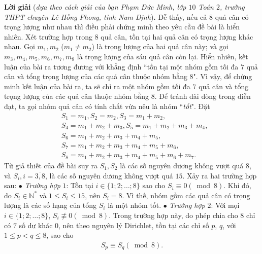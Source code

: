 \begin{multicols}{2}
	\vskip 0.05cm
	\textbf{\color{thachthuctoanhoc}Lời giải} (\textit{dựa theo cách giải của bạn Phạm Đức Minh, lớp $10$ Toán $2$, trường THPT chuyên Lê Hồng Phong, tỉnh Nam Định})\textbf{\color{thachthuctoanhoc}.}
	\vskip 0.05cm
	Dễ thấy, nếu cả $8$ quả cân có trọng lượng như nhau thì điều phải chứng minh theo yêu cầu đề bài là hiển nhiên.
	\vskip 0.05cm
	Xét trường hợp trong $8$ quả cân, tồn tại hai quả cân có trọng lượng khác nhau. Gọi $m_1, m_2$  ($m_1 \ne m_2$) là trọng lượng của hai quả cân này; và gọi $m_3, m_4, m_5,m_6,m_7,m_8$  là trọng lượng của sáu quả cân còn lại.
	\vskip 0.05cm
	Hiển nhiên, kết luận của bài ra tương đương với khẳng định ``tồn tại một nhóm gồm tối đa $7$ quả cân và tổng trọng lượng của các quả cân thuộc nhóm bằng $8$".
	\vskip 0.05cm
	Vì vậy, để chứng minh kết luận của bài ra, ta sẽ chỉ ra một nhóm gồm tối đa $7$ quả cân và tổng trọng lượng của các quả cân thuộc nhóm bằng $8$. Để tránh dài dòng trong diễn đạt, ta gọi nhóm quả cân có tính chất vừa nêu là nhóm ``\textit{tốt}".
	\vskip 0.05cm
	Đặt
	\begin{align*}
		&{S_1} = {m_1},{S_2} = {m_2},{S_3} = {m_1} + {m_2},\\
		&{S_4} = {m_1} \!+\! {m_2} \!+\! {m_3},
		{S_5} = {m_1} \!+\! {m_2} \!+\! {m_3} \!+\! {m_4},\\
		&{S_6} = {m_1} + {m_2} + {m_3} + {m_4} + {m_5},\\
		&{S_7} = {m_1} + {m_2} + {m_3} + {m_4} + {m_5} + {m_6},\\
		&{S_8} = {m_1} + {m_2} + {m_3} + {m_4} + {m_5} + {m_6} + {m_7}.
	\end{align*}
	Từ giả thiết của đề bài suy ra $S_1,S_2$  là các số nguyên dương không vượt quá $8$, và \linebreak$S_i, i = \overline{3,8}$,  là các số nguyên dương không vượt quá $15$.
	\vskip 0.05cm
	Xảy ra hai trường hợp sau:
	\vskip 0.05cm
	$\bullet$ \textit{Trường hợp} $1$: Tồn tại $i \in \{1; 2; \ldots; 8\}$ sao cho ${S_i} \equiv 0\left( {\bmod 8} \right).$
	\vskip 0.05cm 
	Khi đó, do $S_i \in \mathbb{N^*}$  và $1 \le S_i \le 15$,  nên $S_i = 8$.  Vì thế, nhóm gồm các quả cân có trọng lượng là các số hạng của tổng $S_i$  là một nhóm tốt.
	\vskip 0.05cm
	$\bullet$ \textit{Trường hợp} $2$: Với mọi $i \in \{1; 2; \ldots; 8\}$,  ${S_i}\not  \equiv 0\left( {\bmod 8} \right).$
	\vskip 0.05cm
	Trong trường hợp này, do phép chia cho $8$ chỉ có $7$ số dư khác $0$, nên theo nguyên lý Dirichlet, tồn tại các chỉ số $p$, $q$, với $1 \le p < q \le 8$, sao cho
	\begin{align*}
		{S_p} \equiv {S_q}\left( {\bmod 8} \right). \tag{$1$}

\end{align*}
\end{multicols}
